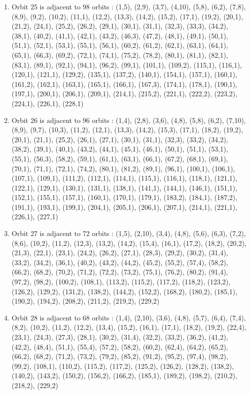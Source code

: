 \documentclass[12pt]{article}
\begin{document}
\begin{enumerate}
\item Orbit 25 is adjacent to 98 orbits : (1,5), (2,9), (3,7), (4,10), (5,8), (6,2), (7,8), (8,9), (9,2), (10,2), (11,1), (12,2), (13,3), (14,2), (15,2), (17,1), (19,2), (20,1), (21,2), (24,1), (25,2), (26,2), (29,1), (30,1), (31,1), (32,3), (33,3), (34,2), (38,1), (40,2), (41,1), (42,1), (43,2), (46,3), (47,2), (48,1), (49,1), (50,1), (51,1), (52,1), (53,1), (55,1), (56,1), (60,2), (61,2), (62,1), (63,1), (64,1), (65,1), (66,3), (69,2), (72,1), (74,1), (75,2), (78,2), (80,1), (81,1), (82,1), (83,1), (89,1), (92,1), (94,1), (96,2), (99,1), (101,1), (109,2), (115,1), (116,1), (120,1), (121,1), (129,2), (135,1), (137,2), (140,1), (154,1), (157,1), (160,1), (161,2), (162,1), (163,1), (165,1), (166,1), (167,3), (174,1), (178,1), (190,1), (197,1), (200,1), (206,1), (209,1), (214,1), (215,2), (221,1), (222,2), (223,2), (224,1), (226,1), (228,1)
\item Orbit 26 is adjacent to 96 orbits : (1,4), (2,8), (3,6), (4,8), (5,8), (6,2), (7,10), (8,9), (9,7), (10,3), (11,2), (12,1), (13,3), (14,2), (15,3), (17,1), (18,2), (19,2), (20,1), (21,1), (25,2), (26,1), (27,1), (30,1), (31,1), (32,3), (33,2), (34,2), (38,2), (39,1), (40,1), (43,2), (44,1), (45,1), (46,1), (50,1), (51,1), (53,1), (55,1), (56,3), (58,2), (59,1), (61,1), (63,1), (66,1), (67,2), (68,1), (69,1), (70,1), (71,1), (72,1), (74,2), (80,1), (81,2), (89,1), (96,1), (100,1), (106,1), (107,1), (109,1), (111,2), (112,1), (114,1), (115,1), (116,1), (118,1), (121,1), (122,1), (129,1), (130,1), (131,1), (138,1), (141,1), (144,1), (146,1), (151,1), (152,1), (155,1), (157,1), (160,1), (170,1), (179,1), (183,2), (184,1), (187,2), (191,1), (193,1), (199,1), (204,1), (205,1), (206,1), (207,1), (214,1), (221,1), (226,1), (227,1)
\item Orbit 27 is adjacent to 72 orbits : (1,5), (2,10), (3,4), (4,8), (5,6), (6,3), (7,2), (8,6), (10,2), (11,2), (12,3), (13,2), (14,2), (15,4), (16,1), (17,2), (18,2), (20,2), (21,3), (22,1), (23,1), (24,2), (26,2), (27,1), (28,3), (29,2), (30,2), (31,4), (33,2), (34,2), (36,1), (40,2), (43,2), (44,2), (45,2), (55,2), (57,4), (58,2), (66,2), (68,2), (70,2), (71,2), (72,2), (73,2), (75,1), (76,2), (80,2), (91,4), (97,2), (98,2), (100,2), (108,1), (113,2), (115,2), (117,2), (118,2), (123,2), (126,2), (129,2), (131,2), (138,2), (144,2), (152,2), (168,2), (180,2), (185,1), (190,2), (194,2), (208,2), (211,2), (219,2), (229,2)
\item Orbit 28 is adjacent to 68 orbits : (1,4), (2,10), (3,6), (4,8), (5,7), (6,4), (7,4), (8,2), (10,2), (11,2), (12,2), (13,4), (15,2), (16,1), (17,1), (18,2), (19,2), (22,4), (23,1), (24,3), (27,3), (28,1), (30,2), (31,4), (32,2), (33,2), (36,2), (41,2), (42,2), (48,4), (51,1), (55,4), (57,2), (58,2), (60,2), (62,4), (64,2), (65,2), (66,2), (68,2), (71,2), (73,2), (79,2), (85,2), (91,2), (95,2), (97,4), (98,2), (99,2), (108,1), (110,2), (115,2), (117,2), (125,2), (126,2), (128,2), (138,2), (140,2), (143,2), (150,2), (156,2), (166,2), (185,1), (189,2), (198,2), (210,2), (218,2), (229,2)

\end{enumerate}
\end{document}
